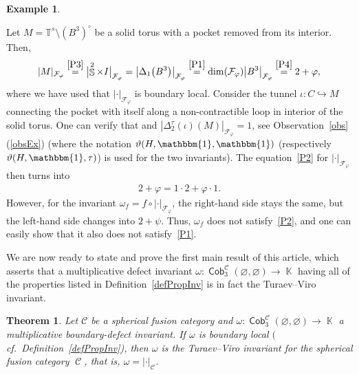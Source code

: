 \documentclass[10pt,a4paper]{amsart}
\DeclareMathOperator{\K}{\mathbb{K}}
\DeclareMathOperator{\Sp}{\mathbb{S}}
\DeclareMathOperator{\Cob}{\mathsf{Cob}}
\DeclareMathOperator{\calc}{\mathcal{C}}
\numberwithin{equation}{section}
\newtheorem{Theorem}{Theorem}[section]
\theoremstyle{definition}
\newtheorem{Example}[Example]{Example}
\begin{document}
\begin{Example}
\begin{enumerate}[(i)]
 Let $M = \mathbb{T}^s \setminus (B^3)^{\circ}$ be a solid torus with a pocket removed from its interior. Then,
 \begin{align*}
 |M|_{\mathcal{F}_{\varphi}} \overset{\rm \ref{P3}}{=} \bigl|{\Sp^2 \times I}\bigr|_{\mathcal{F}_{\varphi}} = \bigl|\Delta_1\bigl(B^3\bigr)\bigr|_{\mathcal{F}_{\varphi}} \overset{\rm \ref{P1}}{=} \dim(\mathcal{F}_{\varphi})\bigl|B^3\bigr|_{\mathcal{F}_{\varphi}} \overset{\rm \ref{P4}}{=} 2+\varphi,
 \end{align*}
 where we have used that $|\cdot|_{\mathcal{F}_{\varphi}}$ is boundary local. Consider the tunnel $\iota\colon C \hookrightarrow M$ connecting the pocket with itself along a non-contractible loop in interior of the solid torus. One can verify that  and $|\Delta_2^{\tau}(\iota)(M)|_{\mathcal{F}_{\varphi}} = 1$, see Observation~\ref{obs}\,(\ref{obsEx}) (where the notation $\vartheta(H, \mathbbm{1},\mathbbm{1})$ (respectively $\vartheta(H, \mathbbm{1},\tau)$) is used for the two invariants). The equation~\ref{P2} for $|\cdot|_{\mathcal{F}_{\varphi}}$ then turns into
 \begin{align*}
 2+\varphi = 1\cdot 2 + \varphi \cdot 1.
 \end{align*}
 However, for the invariant $\omega_f = f \circ |\cdot|_{\mathcal{F}_{\varphi}}$, the right-hand side stays the same, but the left-hand side changes into $2 + \psi$. Thus, $\omega_f$ does not satisfy~\ref{P2}, and one can easily show that it also does not satisfy~\ref{P1}.
 \end{enumerate}
\end{Example}

We are now ready to state and prove the first main result of this article, which asserts that a multiplicative defect invariant $\omega \colon \Cob_3^{\calc}(\varnothing, \varnothing) \rightarrow \K$ having all of the properties listed in Definition~\ref{defPropInv} is in fact the Turaev--Viro invariant.


\begin{Theorem}
 \label{thmMain}
 Let $\mathcal{C}$ be a spherical fusion category and $\omega\colon \Cob_3^{\mathcal{C}}(\varnothing, \varnothing) \rightarrow \K$ a multiplicative boundary-defect invariant. If $\omega$ is boundary local $($cf.\ Definition~{\rm \ref{defPropInv})}, then $\omega$ is the Turaev--Viro invariant for the spherical fusion category $\calc$, that is, $\omega = | \cdot |_{\calc}$.
\end{Theorem}
\end{document}

